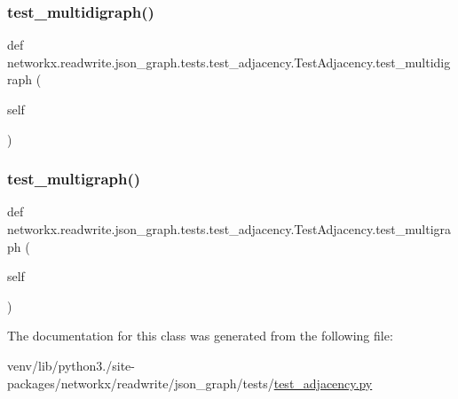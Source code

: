 \subsubsection{\texorpdfstring{test\+\_\+multidigraph()}{test\_multidigraph()}}
{\footnotesize\ttfamily def networkx.\+readwrite.\+json\+\_\+graph.\+tests.\+test\+\_\+adjacency.\+Test\+Adjacency.\+test\+\_\+multidigraph (\begin{DoxyParamCaption}\item[{}]{self }\end{DoxyParamCaption})}

\mbox{\label{classnetworkx_1_1readwrite_1_1json__graph_1_1tests_1_1test__adjacency_1_1TestAdjacency_a5c5b53f89039817393d881ecd5344c9b}} 
\subsubsection{\texorpdfstring{test\+\_\+multigraph()}{test\_multigraph()}}
{\footnotesize\ttfamily def networkx.\+readwrite.\+json\+\_\+graph.\+tests.\+test\+\_\+adjacency.\+Test\+Adjacency.\+test\+\_\+multigraph (\begin{DoxyParamCaption}\item[{}]{self }\end{DoxyParamCaption})}



The documentation for this class was generated from the following file\+:\begin{DoxyCompactItemize}
\item 
venv/lib/python3./site-\/packages/networkx/readwrite/json\+\_\+graph/tests/\hyperlink{test__adjacency_8py}{test\+\_\+adjacency.\+py}\end{DoxyCompactItemize}

